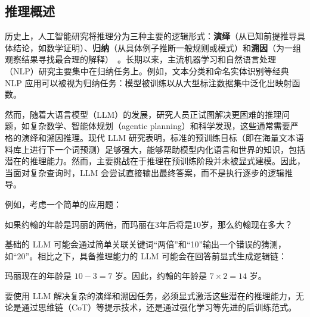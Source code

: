 
\subsection{推理概述}

历史上，人工智能研究将推理分为三种主要的逻辑形式：\textbf{演绎}（从已知前提推导具体结论，如数学证明）、\textbf{归纳}（从具体例子推断一般规则或模式）和\textbf{溯因}（为一组观察结果寻找最合理的解释）~\cite{peirce1931:collected}。长期以来，主流机器学习和自然语言处理（NLP）研究主要集中在归纳任务上。例如，文本分类和命名实体识别等经典 NLP 应用可以被视为归纳任务：模型被训练以从大型标注数据集中泛化出映射函数。

然而，随着大语言模型（LLM）的发展，研究人员正试图解决更困难的推理问题，如复杂数学、智能体规划（agentic planning）和科学发现，这些通常需要严格的演绎和溯因推理。现代 LLM 研究表明，标准的预训练目标（即在海量文本语料库上进行下一个词预测）足够强大，能够帮助模型内化语言和世界的知识，包括潜在的推理能力。然而，主要挑战在于推理在预训练阶段并未被显式建模。因此，当面对复杂查询时，LLM 会尝试直接输出最终答案，而不是执行逐步的逻辑推导。

例如，考虑一个简单的应用题：

\vspace{0.5em}

\begin{tcolorbox}[
    frame empty,
    colback=black!5,
    coltext=black
]

如果约翰的年龄是玛丽的两倍，而玛丽在3年后将是10岁，那么约翰现在多大？

\end{tcolorbox}

\vspace{0.5em}

基础的 LLM 可能会通过简单关联关键词“两倍”和“10”输出一个错误的猜测，如“20”。相比之下，具备推理能力的 LLM 可能会在回答前显式生成逻辑链：

\vspace{0.5em}

\begin{tcolorbox}[
    frame empty,
    colback=black!5,
    coltext=black
]

玛丽现在的年龄是 $10 - 3 = 7$ 岁。因此，约翰的年龄是 $7 \times 2 = 14$ 岁。

\end{tcolorbox}

\vspace{0.5em}

要使用 LLM 解决复杂的演绎和溯因任务，必须显式激活这些潜在的推理能力，无论是通过思维链（CoT）等提示技术，还是通过强化学习等先进的后训练范式。

